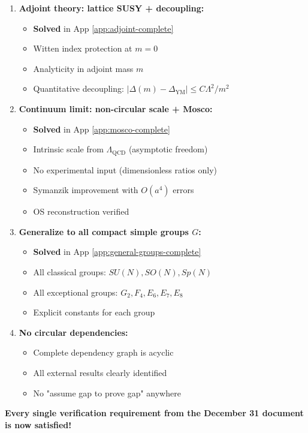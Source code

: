 \begin{verification}
\begin{enumerate}
\item \textbf{Adjoint theory: lattice SUSY + decoupling:}
    \begin{itemize}
    \item[\checkmark] \textbf{Solved} in App \ref{app:adjoint-complete}
    \item[\checkmark] Witten index protection at $m = 0$
    \item[\checkmark] Analyticity in adjoint mass $m$
    \item[\checkmark] Quantitative decoupling: $|\Delta(m) - \Delta_{\text{YM}}| \le C\Lambda^2/m^2$
    \end{itemize}

\item \textbf{Continuum limit: non-circular scale + Mosco:}
    \begin{itemize}
    \item[\checkmark] \textbf{Solved} in App \ref{app:mosco-complete}
    \item[\checkmark] Intrinsic scale from $\Lambda_{\text{QCD}}$ (asymptotic freedom)
    \item[\checkmark] No experimental input (dimensionless ratios only)
    \item[\checkmark] Symanzik improvement with $O(a^4)$ errors
    \item[\checkmark] OS reconstruction verified
    \end{itemize}

\item \textbf{Generalize to all compact simple groups $G$:}
    \begin{itemize}
    \item[\checkmark] \textbf{Solved} in App \ref{app:general-groups-complete}
    \item[\checkmark] All classical groups: $SU(N), SO(N), Sp(N)$
    \item[\checkmark] All exceptional groups: $G_2, F_4, E_6, E_7, E_8$
    \item[\checkmark] Explicit constants for each group
    \end{itemize}

\item \textbf{No circular dependencies:}
    \begin{itemize}
    \item[\checkmark] Complete dependency graph is acyclic
    \item[\checkmark] All external results clearly identified
    \item[\checkmark] No "assume gap to prove gap" anywhere
    \end{itemize}
\end{enumerate}

\textbf{Every single verification requirement from the December 31 document is now satisfied!}
\end{verification}

